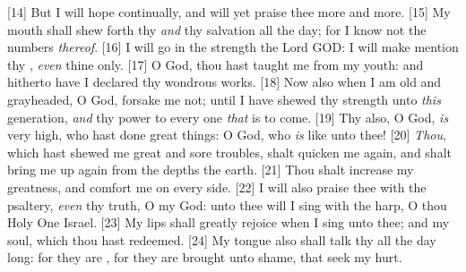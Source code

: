 [14] \textcolor[cmyk]{0.99998,1,0,0}{But I will hope continually, and will yet praise thee more and more.}
[15] \textcolor[cmyk]{0.99998,1,0,0}{My mouth shall shew forth thy  \emph{and} thy salvation all the day; for I know not the numbers \emph{thereof}.}
[16] \textcolor[cmyk]{0.99998,1,0,0}{I will go in the strength   the Lord GOD: I will make mention   thy , \emph{even}   thine only.}
[17] \textcolor[cmyk]{0.99998,1,0,0}{O God, thou hast taught me from my youth: and hitherto have I declared thy wondrous works.}
[18] \textcolor[cmyk]{0.99998,1,0,0}{Now also when I am old and grayheaded, O God, forsake me not; until I have shewed thy strength unto \emph{this} generation, \emph{and} thy power to every one \emph{that} is to come.}
[19] \textcolor[cmyk]{0.99998,1,0,0}{Thy  also, O God, \emph{is} very high, who hast done great things: O God, who \emph{is} like unto thee!}
[20] \textcolor[cmyk]{0.99998,1,0,0}{\emph{Thou}, which hast shewed me great and sore troubles, shalt quicken me again, and shalt bring me up again from the depths   the earth.}
[21] \textcolor[cmyk]{0.99998,1,0,0}{Thou shalt increase my greatness, and comfort me on every side.}
[22] \textcolor[cmyk]{0.99998,1,0,0}{I will also praise thee with the psaltery, \emph{even} thy truth, O my God: unto thee will I sing with the harp, O thou Holy One   Israel.}
[23] \textcolor[cmyk]{0.99998,1,0,0}{My lips shall greatly rejoice when I sing unto thee; and my soul, which thou hast redeemed.}
[24] \textcolor[cmyk]{0.99998,1,0,0}{My tongue also shall talk   thy  all the day long: for they are , for they are brought unto shame, that seek my hurt.}